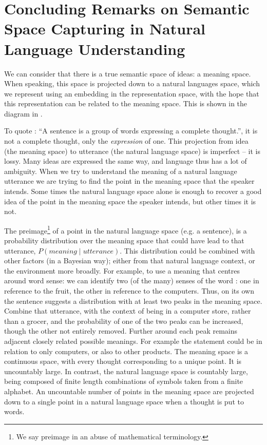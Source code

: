 \documentclass{book}
\begin{document}
\section{Concluding Remarks on Semantic Space Capturing in Natural Language Understanding}

We can consider that there is a true semantic space of ideas: a meaning space.
When speaking, this space is projected down to a natural languages space,
which we represent using an embedding in the representation space, with the hope that this representation can be related to the meaning space.
This is shown in the diagram in .

To quote \citet{webster}:  ``A sentence is a group of words expressing a complete thought.'', it is not a complete thought, only the \emph{expression} of one.
This projection from idea (the meaning space) to utterance (the natural language space) is imperfect -- it is lossy.
Many ideas are expressed the same way, and language thus has a lot of ambiguity.
When we try to understand the meaning of a natural language utterance we are trying to find the point in the meaning space that the speaker intends.
Some times the natural language space alone is enough to recover a good idea of the point in the meaning space the speaker intends,
but other times it is not.

The preimage\footnote{We say preimage in an abuse of mathematical terminology.} of a point in the natural language space (e.g. a sentence),
is a probability distribution over the meaning space that could have lead to that utterance, $P(meaning \mid utterance)$.
This distribution could be combined with other factors (in a Bayesian way); either from that natural language context, or the environment more broadly.
For example, to use a meaning that centres around word sense:
we can identify two (of the many) senses of the word :
one in reference to the fruit, the other in reference to the computers.
Thus, on its own the sentence 
suggests a distribution with at least two peaks in the meaning space.
Combine that utterance, with the context of being in a computer store, rather than a grocer, and the probability of one of the two peaks can be increased, though the other not entirely removed.
Further around each peak remains adjacent closely related possible meanings.
For example the statement could be in relation to only computers, or also to other products.
The meaning space is a continuous space, with every thought corresponding to a unique point. It is uncountably large.
In contrast, the natural language space is countably large, being composed of finite length combinations of symbols taken from a finite alphabet.
An uncountable number of points in the meaning space are projected down to a single point in a natural language space when a thought is put to words.
\end{document}
